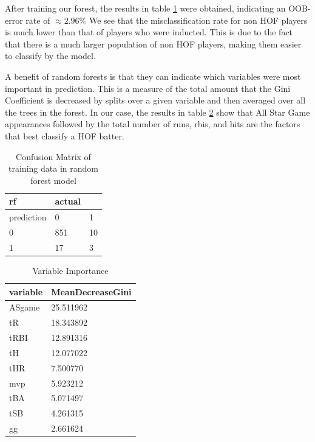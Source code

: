 \documentclass[preprint,12pt]{elsarticle}
\begin{document}
After training our forest, the results in table \ref{rfconf} were obtained, indicating an OOB-error rate of $\approx 2.96\%$ We see that the misclassification rate for non HOF players is much lower than that of players who were inducted. This is due to the fact that there is a much larger population of non HOF players, making them easier to classify by the model. 

A benefit of random forests is that they can indicate which variables were most important in prediction. This is a measure of the total amount that the Gini Coefficient is decreased by splits over a given variable and then averaged over all the trees in the forest. In our case, the results in table \ref{varImp} show that All Star Game appearances followed by the total number of runs, rbis, and hits are the factors that best classify a HOF batter.

\begin{table}[h]
\centering
\begin{tabular}{|l |l l|}
\hline
 rf &  actual & \\
\hline
prediction & 0 & 1 \\
0 & 851 & 10 \\
1 & 17 & 3 \\
\hline
\end{tabular}
\caption{Confusion Matrix of training data in random forest model}
\label{rfconf}
\end{table}

\begin{table}[h]
\centering
\begin{tabular}{|l |l|}
\hline
 variable & MeanDecreaseGini\\
\hline
ASgame & 25.511962 \\
tR     & 18.343892 \\
tRBI   & 12.891316 \\
tH     & 12.077022 \\
tHR    &  7.500770 \\
mvp    &  5.923212 \\
tBA    &  5.071497 \\
tSB    &  4.261315 \\
gg     &  2.661624 \\
\hline
\end{tabular}
\caption{Variable Importance}
\label{varImp}
\end{table}
\end{document}
